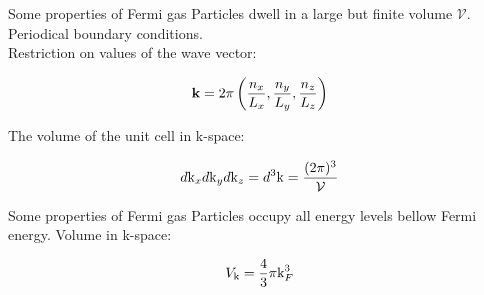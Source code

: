 
\begin{frame}{Some properties of Fermi gas}
  Particles dwell in a large but finite volume $\mathcal{V}$.\\
  Periodical boundary conditions.\\
  Restriction on values of the wave vector:

  \begin{equation}
    \textbf{k} = 2 \pi \left ( \frac{n_x}{L_x},  \frac{n_y}{L_y}, \frac{n_z}{L_z} \right)
  \end{equation}

  The volume of the unit cell in k-space:

  \begin{equation}
    d\text{k}_x d\text{k}_y d\text{k}_z = d^3\text{k} = \frac{(2 \pi)^3}{\mathcal{V}}
  \end{equation}
\end{frame}

\begin{frame}[t]{Some properties of Fermi gas}
  \vspace{0.5cm}
  Particles occupy all energy levels bellow Fermi energy.
  Volume in k-space:

  \begin{equation}
    V_{\text{k}} = \frac{4}{3}\pi \text{k}_F^3
  \end{equation}

\end{frame}

